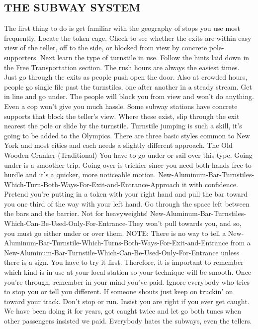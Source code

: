 \documentclass[11pt,twoside,a4paper]{book}
\begin{document}
\subsection{THE SUBWAY SYSTEM}
The first thing to do is get familiar with the geography of stops you use most frequently. Locate the token cage. Check to see whether the exits are within easy view of the teller, off to the side, or blocked from view by concrete pole-supporters. Next learn the type of turnstile in use. Follow the hints laid down in the Free Transportation section. The rush hours are always the easiest times. Just go through the exits as people push open the door. Also at crowded hours, people go single file past the turnstiles, one after another in a steady stream. Get in line and go under. The people will block you from view and won't do anything. Even a cop won't give you much hassle. Some subway stations have concrete supports that block the teller's view. Where these exist, slip through the exit nearest the pole or slide by the turnstile. Turnstile jumping is such a skill, it's going to be added to the Olympics. There are three basic styles common to New York and most cities and each needs a slightly different approach. The Old Wooden Cranker-(Traditional) You have to go under or sail over this type. Going under is a smoother trip. Going over is trickier since you need both hands free to hurdle and it's a quicker, more noticeable motion. New-Aluminum-Bar-Turnstiles-Which-Turn-Both-Ways-For-Exit-and-Entrance-Approach it with confidence. Pretend you're putting in a token with your right hand and pull the bar toward you one third of the way with your left hand. Go through the space left between the bars and the barrier. Not for heavyweights! New-Aluminum-Bar-Turnstiles-Which-Can-Be-Used-Only-For-Entrance-They won't pull towards you, and so, you must go either under or over them. NOTE: There is no way to tell a New-Aluminum-Bar-Turnstile-Which-Turns-Both-Ways-For-Exit-and-Entrance from a New-Aluminum-Bar-Turnstile-Which-Can-Be-Used-Only-For-Entrance unless there is a sign. You have to try it first. Therefore, it is important to remember which kind is in use at your local station so your technique will be smooth. Once you're through, remember in your mind you've paid. Ignore everybody who tries to stop you or tell you different. If someone shouts just keep on truckin' on toward your track. Don't stop or run. Insist you are right if you ever get caught. We have been doing it for years, got caught twice and let go both tunes when other passengers insisted we paid. Everybody hates the subways, even the tellers.
\end{document}
